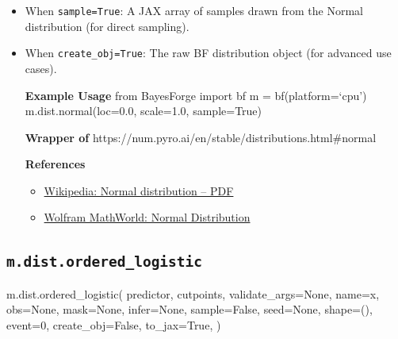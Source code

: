 \documentclass[
  letterpaper,
  DIV=11,
  numbers=noendperiod]{scrartcl}
\newenvironment{Shaded}{\begin{snugshade}}{\end{snugshade}}
\newcommand{\DecValTok}[1]{\textcolor[rgb]{0.68,0.00,0.00}{#1}}
\newcommand{\NormalTok}[1]{\textcolor[rgb]{0.00,0.23,0.31}{#1}}
\newcommand{\OperatorTok}[1]{\textcolor[rgb]{0.37,0.37,0.37}{#1}}
\newcommand{\StringTok}[1]{\textcolor[rgb]{0.13,0.47,0.30}{#1}}
\newcommand{\VariableTok}[1]{\textcolor[rgb]{0.07,0.07,0.07}{#1}}
\providecommand{\tightlist}{%
  \setlength{\itemsep}{0pt}\setlength{\parskip}{0pt}}\usepackage{longtable,booktabs,array}
\begin{document}
\begin{itemize}
\item
  When \texttt{sample=True}: A JAX array of samples drawn from the
  Normal distribution (for direct sampling).
\item
  When \texttt{create\_obj=True}: The raw BF distribution object (for
  advanced use cases).

  \textbf{Example Usage} from BayesForge import bf m =
  bf(platform=`cpu') m.dist.normal(loc=0.0, scale=1.0, sample=True)

  \textbf{Wrapper of}
  https://num.pyro.ai/en/stable/distributions.html\#normal

  \textbf{References}

  \begin{itemize}
  \tightlist
  \item
    \href{https://en.wikipedia.org/wiki/Normal_distribution\#Probability_density_function}{Wikipedia:
    Normal distribution -- PDF}
  \item
    \href{https://mathworld.wolfram.com/NormalDistribution.html}{Wolfram
    MathWorld: Normal Distribution}
  \end{itemize}
\end{itemize}

\subsection{\texorpdfstring{\texttt{m.dist.ordered\_logistic}}{m.dist.ordered\_logistic}}\label{ordered_logistic}

\begin{Shaded}
\begin{Highlighting}[]
\NormalTok{m.dist.ordered\_logistic(}
\NormalTok{    predictor,}
\NormalTok{    cutpoints,}
\NormalTok{    validate\_args}\OperatorTok{=}\VariableTok{None}\NormalTok{,}
\NormalTok{    name}\OperatorTok{=}\StringTok{\textquotesingle{}x\textquotesingle{}}\NormalTok{,}
\NormalTok{    obs}\OperatorTok{=}\VariableTok{None}\NormalTok{,}
\NormalTok{    mask}\OperatorTok{=}\VariableTok{None}\NormalTok{,}
\NormalTok{    infer}\OperatorTok{=}\VariableTok{None}\NormalTok{,}
\NormalTok{    sample}\OperatorTok{=}\VariableTok{False}\NormalTok{,}
\NormalTok{    seed}\OperatorTok{=}\VariableTok{None}\NormalTok{,}
\NormalTok{    shape}\OperatorTok{=}\NormalTok{(),}
\NormalTok{    event}\OperatorTok{=}\DecValTok{0}\NormalTok{,}
\NormalTok{    create\_obj}\OperatorTok{=}\VariableTok{False}\NormalTok{,}
\NormalTok{    to\_jax}\OperatorTok{=}\VariableTok{True}\NormalTok{,}
\NormalTok{)}
\end{Highlighting}
\end{Shaded}
\end{document}

